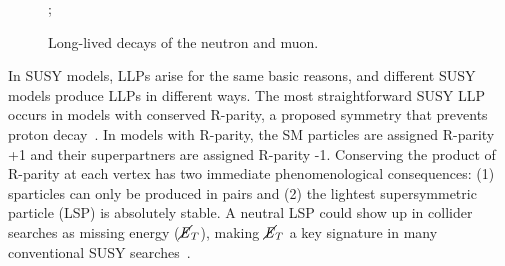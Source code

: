 \documentclass[12pt]{article}
\begin{document}
        \noindent \begin{figure}[htbp] \begin{center}
            \qquad\qquad
            ;
            \caption{Long-lived decays of the neutron and muon.}
            \label{sm_llp_processes}
        \end{center} \end{figure}

    In SUSY models, LLPs arise for the same basic reasons, and different SUSY models produce LLPs in different ways. The most straightforward SUSY LLP occurs in models with conserved R-parity, a proposed symmetry that prevents proton decay~\cite{primer}. In models with R-parity, the SM particles are assigned R-parity +1 and their superpartners are assigned R-parity -1. Conserving the product of R-parity at each vertex has two immediate phenomenological consequences: (1) sparticles can only be produced in pairs and (2) the lightest supersymmetric particle (LSP) is absolutely stable. A neutral LSP could show up in collider searches as missing energy ($\cancel{\it{E}}_{T}$), making $\cancel{\it{E}}_{T}$ a key signature in many conventional SUSY searches~\cite{primer}.
\end{document}
